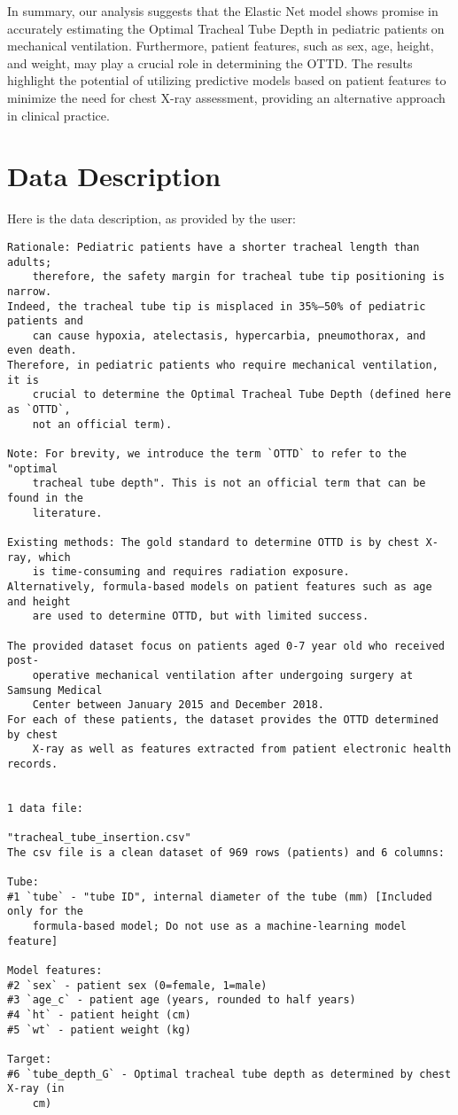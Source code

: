 \documentclass[11pt]{article}
\begin{document}
In summary, our analysis suggests that the Elastic Net model shows promise in accurately estimating the Optimal Tracheal Tube Depth in pediatric patients on mechanical ventilation. Furthermore, patient features, such as sex, age, height, and weight, may play a crucial role in determining the OTTD. The results highlight the potential of utilizing predictive models based on patient features to minimize the need for chest X-ray assessment, providing an alternative approach in clinical practice.


\clearpage
\appendix

\section{Data Description} \label{sec:data_description} Here is the data description, as provided by the user:

\begin{Verbatim}[tabsize=4]
Rationale: Pediatric patients have a shorter tracheal length than adults;
	therefore, the safety margin for tracheal tube tip positioning is narrow.
Indeed, the tracheal tube tip is misplaced in 35%–50% of pediatric patients and
	can cause hypoxia, atelectasis, hypercarbia, pneumothorax, and even death.
Therefore, in pediatric patients who require mechanical ventilation, it is
	crucial to determine the Optimal Tracheal Tube Depth (defined here as `OTTD`,
	not an official term).

Note: For brevity, we introduce the term `OTTD` to refer to the "optimal
	tracheal tube depth". This is not an official term that can be found in the
	literature.

Existing methods: The gold standard to determine OTTD is by chest X-ray, which
	is time-consuming and requires radiation exposure.
Alternatively, formula-based models on patient features such as age and height
	are used to determine OTTD, but with limited success.

The provided dataset focus on patients aged 0-7 year old who received post-
	operative mechanical ventilation after undergoing surgery at Samsung Medical
	Center between January 2015 and December 2018.
For each of these patients, the dataset provides the OTTD determined by chest
	X-ray as well as features extracted from patient electronic health records.


1 data file:

"tracheal_tube_insertion.csv"
The csv file is a clean dataset of 969 rows (patients) and 6 columns:

Tube:
#1 `tube` - "tube ID", internal diameter of the tube (mm) [Included only for the
	formula-based model; Do not use as a machine-learning model feature]

Model features:
#2 `sex` - patient sex (0=female, 1=male)
#3 `age_c` - patient age (years, rounded to half years)
#4 `ht` - patient height (cm)
#5 `wt` - patient weight (kg)

Target:
#6 `tube_depth_G` - Optimal tracheal tube depth as determined by chest X-ray (in
	cm)



\end{Verbatim}
\end{document}
